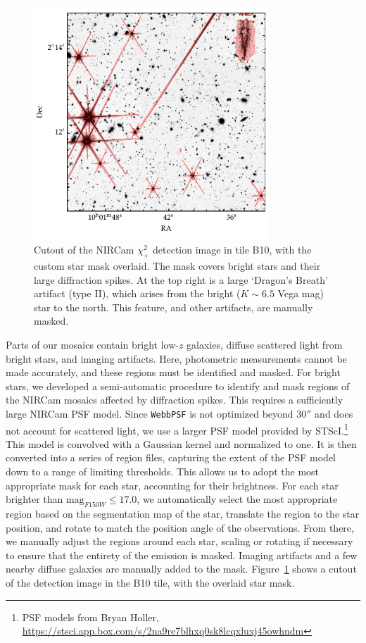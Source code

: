 \documentclass[longauth]{aa}
\begin{document}
\begin{figure}[t!] 
\includegraphics[width=8.8cm]{figures/starmask_plot.pdf}
\caption{Cutout of the NIRCam $\chi^2_+$ detection image in tile B10, with the custom star mask overlaid. The mask covers bright stars and their large diffraction spikes. At the top right is a large `Dragon's Breath' artifact (type II), which arises from the bright ($K\sim 6.5$ Vega mag) star to the north. This feature, and other artifacts, are manually masked.
\label{fig:starmask}}
\end{figure}

Parts of our mosaics contain bright low-$z$ galaxies, diffuse scattered light from bright stars, and imaging artifacts. Here, photometric measurements cannot be made accurately, and these regions must be identified and masked. For bright stars, we developed a semi-automatic procedure to identify and mask regions of the NIRCam mosaics affected by diffraction spikes. This requires a sufficiently large NIRCam PSF model. Since \texttt{WebbPSF} is not optimized beyond $\ang{;;30}$ and does not account for scattered light, we use a larger PSF model provided by STScI.\footnote{PSF models from Bryan Holler, \url{ https://stsci.app.box.com/s/2na9re7blhxq0sk8lcqxluxj45owhndm}} 
This model is convolved with a Gaussian kernel and normalized to one. It is then converted into a series of region files, capturing the extent of the PSF model down to a range of limiting thresholds. This allows us to adopt the most appropriate mask for each star, accounting for their brightness. For each star brighter than $\text{mag}_{F150W} \leq 17.0$, we automatically select the most appropriate region based on the segmentation map of the star, translate the region to the star position, and rotate to match the position angle of the observations. From there, we manually adjust the regions around each star, scaling or rotating if necessary to ensure that the entirety of the emission is masked.  Imaging artifacts and a few nearby diffuse galaxies are manually added to the mask. 
Figure~\ref{fig:starmask} shows a cutout of the detection image in the B10 tile, with the overlaid star mask. 
\end{document}
